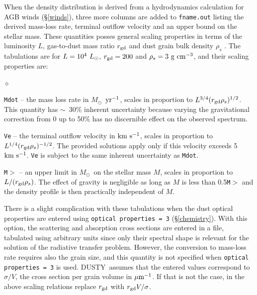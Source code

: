 \documentclass[11pt]{article}
\def\D  {{\sf DUSTY}}
\def\E#1{\hbox{$10^{#1}$}}
\def\about  {\hbox{$\sim$}}
\def\mic    {\hbox{$\mu$m}}
\def\Mo     {\hbox{$M_{\odot}$}}
\def\Lo     {\hbox{$L_{\odot}$}}
\def\kms    {\hbox{$\rm km\ s^{-1}$}}
\begin{document}
When the density distribution is derived from a hydrodynamics calculation for
AGB winds (\S\ref{winds}), three more columns are added to {\tt fname.out}
listing the derived mass-loss rate, terminal outflow velocity and an upper
bound on the stellar mass.  These quantities posses general scaling properties
in terms of the luminosity $L$, gas-to-dust mass ratio $r_{\rm gd}$ and dust
grain bulk density $\rho_s$ \cite{IEprep}.  The tabulations are for $L = \E4\
\Lo$, $r_{\rm gd} = 200$ and $\rho_s = 3\ \rm g~cm^{-3}$, and their scaling
properties are:
\begin{list}{$\diamond$}{}
\item {\tt Mdot} -- the mass loss rate in \Mo\ $\rm yr^{-1}$, scales in
    proportion to $L^{3/4}(r_{\rm gd}\rho_s)^{1/2}$.  This quantity has \about\
    30\% inherent uncertainty because varying the gravitational correction from
    0 up to 50\% has no discernible effect on the observed spectrum.
\item {\tt Ve} -- the terminal outflow velocity in \kms, scales in proportion
    to $L^{1/4}(r_{\rm gd}\rho_s)^{-1/2}$. The provided solutions apply only if
    this velocity exceeds 5 \kms.  {\tt Ve} is subject to the same inherent
    uncertainty as {\tt Mdot}.
\item {\tt M$>$} -- an upper limit in \Mo\ on the stellar mass $M$, scales in
    proportion to $L/(r_{\rm gd}\rho_s)$.  The effect of gravity is negligible
    as long as $M$ is less than 0.5{\tt *M$>$} and the density profile is then
    practically independent of $M$.

\end{list}
There is a slight complication with these tabulations when the dust optical
properties are entered using {\tt optical properties = 3} (\S \ref{chemistry}).
With this option, the scattering and absorption cross sections are entered in a
file, tabulated using arbitrary units since only their spectral shape is
relevant for the solution of the radiative transfer problem. However, the
conversion to mass-loss rate requires also the grain size, and this quantity is
not specified when {\tt optical properties = 3} is used.  \D\ assumes that the
entered values correspond to $\sigma/V$, the cross section per grain volume in
$\mic^{-1}$.  If that is not the case, in the above scaling relations replace
$r_{\rm gd}$ with $r_{\rm gd}V/\sigma$.
\end{document}
